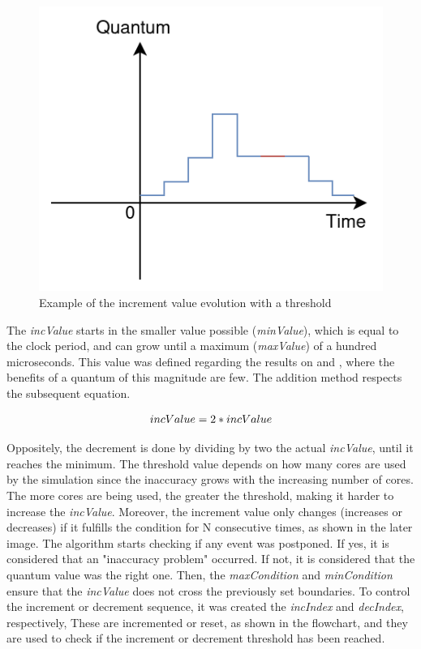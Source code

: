 \begin{figure}[h!]
	\centering
 	\includegraphics[width=0.4\linewidth]{Images/incAlgorithm_graph.png}
 	\caption{Example of the increment value evolution with a threshold}
	 \label{fig_incAlgorithm_graph}
\end{figure}

The \textit{incValue} starts in the smaller value possible (\textit{minValue}), which is equal to the clock period, 
and can grow until a maximum (\textit{maxValue}) of a hundred microseconds.  
This value was defined regarding the results on \cite{pargem5} and \cite{BeyondQuantumTDSim}, where the benefits of a 
quantum of this magnitude are few. The addition method respects the subsequent equation.

\begin{equation}
    \label{eq_incValue}
    \centering
        \Large
        incValue = 2 * incValue
        \normalsize
\end{equation}
\vspace{0.3cm}

Oppositely, the decrement is done by dividing by two the actual \textit{incValue}, until it reaches the minimum. The threshold value depends on how 
many cores are used by the simulation since the inaccuracy grows with the increasing number of cores. The more cores are being used, the greater 
the threshold, making it harder to increase the \textit{incValue}. Moreover, the increment value only changes (increases or decreases) if it 
fulfills the condition for N consecutive times, as shown in the later image. The algorithm starts checking if any event 
was postponed. If yes, it is considered that an "inaccuracy problem" occurred. If not, it is considered that the quantum value was the right one.
Then, the \textit{maxCondition} and \textit{minCondition} ensure that the \textit{incValue} does not cross the previously set boundaries. To control the 
increment or decrement sequence, it was created the \textit{incIndex} and \textit{decIndex}, respectively, These are incremented or reset, as 
shown in the flowchart, and they are used to check if the increment or decrement threshold has been reached.

